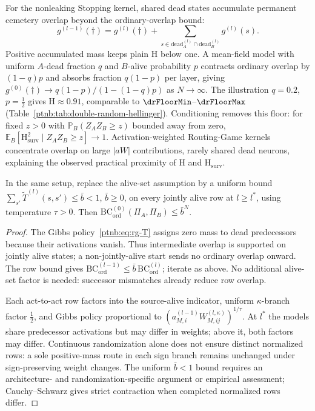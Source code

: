 \begin{remark}\label{ptnb:rem:adf-cemetery-floor}
For the nonleaking Stopping kernel, shared dead states accumulate permanent cemetery overlap beyond the ordinary-overlap bound:
\[
g^{(l-1)}(\dagger)=g^{(l)}(\dagger)+
\sum_{s\in\mathrm{dead}^{(l)}_A\cap\mathrm{dead}^{(l)}_B}g^{(l)}(s).
\]
Positive accumulated mass keeps plain $\mathrm H$ below one. A mean-field model with uniform
$A$-dead fraction $q$ and $B$-alive probability $p$ contracts ordinary overlap by $(1-q)p$
and absorbs fraction $q(1-p)$ per layer, giving
$g^{(0)}(\dagger)\to q(1-p)/(1-(1-q)p)$ as $N\to\infty$.
The illustration $q=0.2$, $p=\tfrac12$ gives $\mathrm H\approx0.91$, comparable to
$\drFloorMin$--$\drFloorMax$ (Table~\ref{ptnb:tab:double-random-hellinger}).
Conditioning removes this floor: for fixed $z>0$ with $\mathbb P_B(Z_AZ_B\ge z)$ bounded away
from zero, $\mathbb E_B[\mathrm H^2_{\mathrm{surv}}\mid Z_AZ_B\ge z]\to1$.
Activation-weighted Routing-Game kernels concentrate overlap on large $|aW|$ contributions,
rarely shared dead neurons, explaining the observed practical proximity of $\mathrm H$ and $\mathrm H_{\mathrm{surv}}$.
\end{remark}

\begin{theoremenv}\label{ptnb:thm:rand-routing}\label{thm:rand_routing}
In the same setup, replace the alive-set assumption by a uniform bound
$\sum_{s'}\widetilde T^{(l)}(s,s')\le\bar b<1$, $\bar b\ge0$, on every jointly alive row
at $l\ge l^*$, using temperature $\tau>0$. Then
$\mathrm{BC}^{(0)}_{\mathrm{ord}}(\Pi_A,\Pi_B)\le\bar b^N$.
\end{theoremenv}
\begin{proof}
The Gibbs policy~\eqref{ptnb:eq:rg-T} assigns zero mass to dead predecessors because their activations vanish.
Thus intermediate overlap is supported on jointly alive states; a non-jointly-alive start
sends no ordinary overlap onward. The row bound gives
$\mathrm{BC}^{(l-1)}_{\mathrm{ord}}\le\bar b\,\mathrm{BC}^{(l)}_{\mathrm{ord}}$;
iterate as above. No additional alive-set factor is needed: successor mismatches already reduce row overlap.

Each act-to-act row factors into the source-alive indicator, uniform $\kappa$-branch factor
$\tfrac12$, and Gibbs policy proportional to $(a^{(l-1)}_{M,i}W^{(l,\kappa)}_{M,ij})^{1/\tau}$.
At $l^*$ the models share predecessor activations but may differ in weights; above it, both
factors may differ. Continuous randomization alone does not ensure distinct normalized rows:
a sole positive-mass route in each sign branch remains unchanged under sign-preserving weight changes.
The uniform $\bar b<1$ bound requires an architecture- and randomization-specific argument or
empirical assessment; Cauchy--Schwarz gives strict contraction when completed normalized rows differ.
\end{proof}

